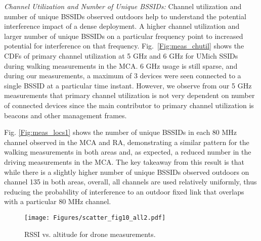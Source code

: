 \documentclass[sigconf,10pt]{acmart}
\begin{document}
{\it Channel Utilization and Number of Unique BSSIDs:} Channel utilization and number of unique BSSIDs observed outdoors help to understand the potential interference impact of a dense deployment. A higher channel utilization and larger number of unique BSSIDs on a particular frequency point to increased potential for interference on that frequency. Fig.~\ref{Fig:meas_chutil} shows the CDFs of primary channel utilization at 5 GHz and 6 GHz for UMich SSIDs during walking measurements in the MCA. 6 GHz usage is still sparse, and during our measurements, a maximum of 3 devices were seen connected to a single BSSID at a
particular time instant. However, we observe from our 5 GHz measurements
that primary channel utilization is not very dependent on number of connected devices since the main
contributor to primary channel utilization is beacons and other management frames.

Fig. \ref{Fig:meas_locs1} shows the number of unique BSSIDs in each 80 MHz channel observed in the MCA and RA, demonstrating a similar pattern for the walking measurements in both areas and, as expected, a reduced number in the driving measurements in the MCA. The key takeaway from this result is that while there is a slightly higher number of unique BSSIDs observed outdoors on channel 135 in both areas, overall, all channels are used relatively uniformly, thus reducing the probability of interference to an outdoor fixed link that overlaps with a particular 80 MHz channel.

\begin{figure}
    \centering
    \texttt{[image: Figures/scatter\_fig10\_all2.pdf]} \vspace{-1em}
\caption{RSSI vs. altitude for drone measurements.}
    \label{Fig:drone_meas}
    \vspace{-2em}
\end{figure}
\end{document}
